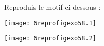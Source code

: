 Reproduis le motif ci-dessous :
\begin{center}
  \texttt{[image: 6reprofigexo58.1]}
\end{center}
\hspace{1cm}
\begin{center}
   \texttt{[image: 6reprofigexo58.2]}  
\end{center}